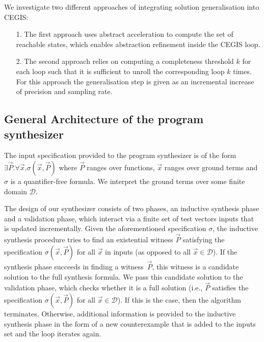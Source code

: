 \documentclass[runningheads,a4paper]{llncs}
\begin{document}
We investigate two different approaches of integrating solution generalisation 
into CEGIS:
\begin{itemize}
\item[1.] The first approach uses abstract acceleration to compute the set of reachable states, which 
enables abstraction refinement inside the CEGIS loop. 
\item[2.] The second approach relies on computing a completeness threshold $k$ for each loop such that it is sufficient to 
unroll the corresponding loop $k$ times. For this approach the generalisation step is given as an incremental
increase of precision and sampling rate.
\end{itemize}
\subsection{General Architecture of the program synthesizer}
\label{synthesizer-general}
%
% 
The input specification provided to the program synthesizer is of the form
$\exists \vec{P} .  \forall \vec{x}.  \sigma(\vec{x}, \vec{P})$ where
$\vec{P}$ ranges over functions, $\vec{x}$ ranges over ground terms and
$\sigma$ is a quantifier-free formula.  We interpret the ground terms over
some finite domain $\mathcal{D}$.

The design of our synthesizer 
consists of two phases, an inductive synthesis phase and a validation phase,
which interact via a finite set of test vectors {\sc inputs} that is updated incrementally. 
Given the aforementioned specification $\sigma$, the inductive synthesis
procedure
tries to find an existential witness $\vec{P}$ satisfying the specification
$\sigma(\vec{x}, \vec{P})$ for all $\vec{x}$ in {\sc inputs} (as opposed to
all $\vec{x} \in \mathcal{D}$).
%
If the synthesis phase succeeds in finding a witness~$\vec{P}$, this witness
is a candidate solution to the full synthesis formula.  We pass this
candidate solution to the validation phase, which checks whether it is a full
solution (i.e., $\vec{P}$ satisfies the specification $\sigma(\vec{x},
\vec{P})$ for all $\vec{x}\in\mathcal{D}$).
%
%
%
If this is the case, then the algorithm terminates.  Otherwise, additional
information is provided to the inductive synthesis phase in the form of a new
counterexample that is added to the {\sc inputs} set and the loop iterates
again.
\end{document}
